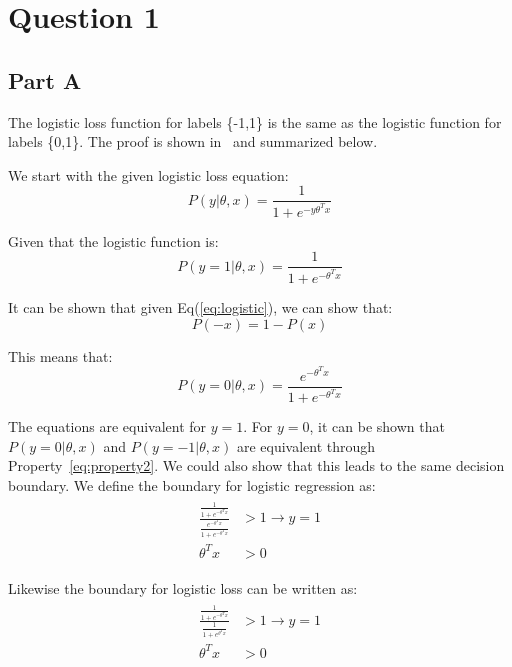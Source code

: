 \documentclass[11pt]{article}
\begin{document}
\section*{Question 1}
\subsection*{Part A}

The logistic loss function for labels \{-1,1\} is the same as the logistic function 
for labels \{0,1\}. The proof is shown in~\cite{logisticloss} and summarized below.

We start with the given logistic loss equation:
\begin{equation}
		P(y | \theta, x) = \frac{1}{1+e^{-y\theta^Tx}}
		\label{eq:loss}
\end{equation}


Given that the logistic function is:
\begin{equation}
		P(y=1 | \theta, x) = \frac{1}{1+e^{-\theta^Tx}}
		\label{eq:logistic}
\end{equation}

It can be shown that given Eq(\ref{eq:logistic}), we can show that: 
\begin{equation}
		P(-x) = 1 - P(x)
\label{eq:property2}
\end{equation}

This means that:
\begin{equation}
		P(y=0 | \theta, x) = \frac{e^{-\theta^Tx}}{1+e^{-\theta^Tx}}
\end{equation}

The equations are equivalent for $y=1$. For $y=0$, it can be shown that 
$P(y=0|\theta, x)$ and $P(y=-1|\theta,x)$ are equivalent through 
Property~\ref{eq:property2}. We could also show that this leads to the same decision 
boundary. We define the boundary for logistic regression as:
\begin{align}
		\begin{split}
				\frac{\frac{1}{1+e^{-\theta^Tx}}}{\frac{e^{-\theta^Tx}}{1+e^{-\theta^Tx}}} &> 1 \rightarrow y=1 \\
		\theta^Tx &> 0 
		\end{split}
\end{align}

Likewise the boundary for logistic loss can be written as:
\begin{align}
		\begin{split}
				\frac{\frac{1}{1+e^{-\theta^Tx}}}{\frac{1}{1+e^{\theta^Tx}}} &> 1 \rightarrow y=1 \\
		\theta^Tx &> 0
		\end{split}
\end{align}
\end{document}
